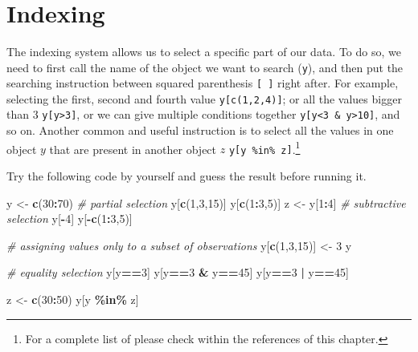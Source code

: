 \documentclass[
]{svmono}
\newenvironment{Shaded}{\begin{snugshade}}{\end{snugshade}}
\newcommand{\CommentTok}[1]{\textcolor[rgb]{0.56,0.35,0.01}{\textit{#1}}}
\newcommand{\DecValTok}[1]{\textcolor[rgb]{0.00,0.00,0.81}{#1}}
\newcommand{\FunctionTok}[1]{\textcolor[rgb]{0.13,0.29,0.53}{\textbf{#1}}}
\newcommand{\NormalTok}[1]{#1}
\newcommand{\OtherTok}[1]{\textcolor[rgb]{0.56,0.35,0.01}{#1}}
\newcommand{\SpecialCharTok}[1]{\textcolor[rgb]{0.81,0.36,0.00}{\textbf{#1}}}
\begin{document}
~

~

~

\hypertarget{indexing}{%
\section{Indexing}\label{indexing}}

The indexing system allows us to select a specific part of our data. To
do so, we need to first call the name of the object we want to search
(\texttt{y}), and then put the searching instruction between squared
parenthesis \texttt{{[}\ {]}} right after. For example, selecting the first, second
and fourth value \texttt{y{[}c(1,2,4){]}}; or all the values bigger than 3
\texttt{y{[}y\textgreater{}3{]}}, or we can give multiple conditions together \texttt{y{[}y\textless{}3\ \&\ y\textgreater{}10{]}},
and so on. Another common and useful instruction is to select all the
values in one object \(y\) that are present in another object \(z\)
\texttt{y{[}y\ \%in\%\ z{]}}.\footnote{For a complete list of please check within the references of this
  chapter.}

Try the following code by yourself and guess the result before running
it.

\begin{Shaded}
\begin{Highlighting}[]
\NormalTok{y }\OtherTok{\textless{}{-}} \FunctionTok{c}\NormalTok{(}\DecValTok{30}\SpecialCharTok{:}\DecValTok{70}\NormalTok{)}
\CommentTok{\# partial selection}
\NormalTok{y[}\FunctionTok{c}\NormalTok{(}\DecValTok{1}\NormalTok{,}\DecValTok{3}\NormalTok{,}\DecValTok{15}\NormalTok{)]}
\NormalTok{y[}\FunctionTok{c}\NormalTok{(}\DecValTok{1}\SpecialCharTok{:}\DecValTok{3}\NormalTok{,}\DecValTok{5}\NormalTok{)]}
\NormalTok{z }\OtherTok{\textless{}{-}}\NormalTok{ y[}\DecValTok{1}\SpecialCharTok{:}\DecValTok{4}\NormalTok{]}
\CommentTok{\# subtractive selection}
\NormalTok{y[}\SpecialCharTok{{-}}\DecValTok{4}\NormalTok{]}
\NormalTok{y[}\SpecialCharTok{{-}}\FunctionTok{c}\NormalTok{(}\DecValTok{1}\SpecialCharTok{:}\DecValTok{3}\NormalTok{,}\DecValTok{5}\NormalTok{)]}

\CommentTok{\# assigning values only to a subset of observations}
\NormalTok{y[}\FunctionTok{c}\NormalTok{(}\DecValTok{1}\NormalTok{,}\DecValTok{3}\NormalTok{,}\DecValTok{15}\NormalTok{)] }\OtherTok{\textless{}{-}} \DecValTok{3}
\NormalTok{y}

\CommentTok{\# equality selection}
\NormalTok{y[y}\SpecialCharTok{==}\DecValTok{3}\NormalTok{]}
\NormalTok{y[y}\SpecialCharTok{==}\DecValTok{3} \SpecialCharTok{\&}\NormalTok{ y}\SpecialCharTok{==}\DecValTok{45}\NormalTok{]}
\NormalTok{y[y}\SpecialCharTok{==}\DecValTok{3} \SpecialCharTok{|}\NormalTok{ y}\SpecialCharTok{==}\DecValTok{45}\NormalTok{]}

\NormalTok{z }\OtherTok{\textless{}{-}} \FunctionTok{c}\NormalTok{(}\DecValTok{30}\SpecialCharTok{:}\DecValTok{50}\NormalTok{)}
\NormalTok{y[y }\SpecialCharTok{\%in\%}\NormalTok{ z]}
\end{Highlighting}
\end{Shaded}
\end{document}
